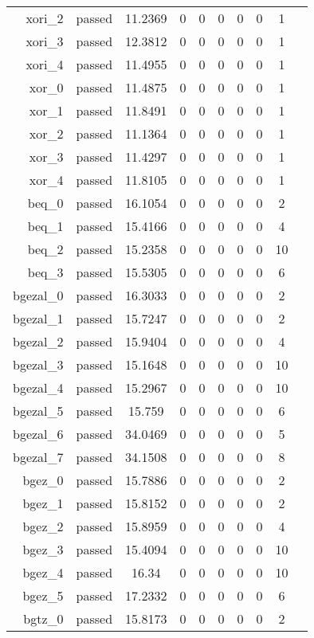 \begin{longtable}{r|ccccccccc}
    xori\_2 & passed & 11.2369 & 0 & 0 & 0 & 0 & 0 & 1 \\
    xori\_3 & passed & 12.3812 & 0 & 0 & 0 & 0 & 0 & 1 \\
    xori\_4 & passed & 11.4955 & 0 & 0 & 0 & 0 & 0 & 1 \\
    xor\_0 & passed & 11.4875 & 0 & 0 & 0 & 0 & 0 & 1 \\
    xor\_1 & passed & 11.8491 & 0 & 0 & 0 & 0 & 0 & 1 \\
    xor\_2 & passed & 11.1364 & 0 & 0 & 0 & 0 & 0 & 1 \\
    xor\_3 & passed & 11.4297 & 0 & 0 & 0 & 0 & 0 & 1 \\
    xor\_4 & passed & 11.8105 & 0 & 0 & 0 & 0 & 0 & 1 \\
    beq\_0 & passed & 16.1054 & 0 & 0 & 0 & 0 & 0 & 2 \\
    beq\_1 & passed & 15.4166 & 0 & 0 & 0 & 0 & 0 & 4 \\
    beq\_2 & passed & 15.2358 & 0 & 0 & 0 & 0 & 0 & 10 \\
    beq\_3 & passed & 15.5305 & 0 & 0 & 0 & 0 & 0 & 6 \\
    bgezal\_0 & passed & 16.3033 & 0 & 0 & 0 & 0 & 0 & 2 \\
    bgezal\_1 & passed & 15.7247 & 0 & 0 & 0 & 0 & 0 & 2 \\
    bgezal\_2 & passed & 15.9404 & 0 & 0 & 0 & 0 & 0 & 4 \\
    bgezal\_3 & passed & 15.1648 & 0 & 0 & 0 & 0 & 0 & 10 \\
    bgezal\_4 & passed & 15.2967 & 0 & 0 & 0 & 0 & 0 & 10 \\
    bgezal\_5 & passed & 15.759 & 0 & 0 & 0 & 0 & 0 & 6 \\
    bgezal\_6 & passed & 34.0469 & 0 & 0 & 0 & 0 & 0 & 5 \\
    bgezal\_7 & passed & 34.1508 & 0 & 0 & 0 & 0 & 0 & 8 \\
    bgez\_0 & passed & 15.7886 & 0 & 0 & 0 & 0 & 0 & 2 \\
    bgez\_1 & passed & 15.8152 & 0 & 0 & 0 & 0 & 0 & 2 \\
    bgez\_2 & passed & 15.8959 & 0 & 0 & 0 & 0 & 0 & 4 \\
    bgez\_3 & passed & 15.4094 & 0 & 0 & 0 & 0 & 0 & 10 \\
    bgez\_4 & passed & 16.34 & 0 & 0 & 0 & 0 & 0 & 10 \\
    bgez\_5 & passed & 17.2332 & 0 & 0 & 0 & 0 & 0 & 6 \\
    bgtz\_0 & passed & 15.8173 & 0 & 0 & 0 & 0 & 0 & 2 \\

\end{longtable}
